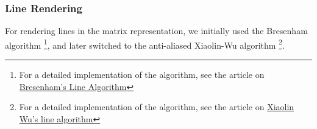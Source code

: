 \subsubsection{Line Rendering}

For rendering lines in the matrix representation, we initially used the Bresenham algorithm \footnote{For a detailed implementation of the algorithm, see the article on \href{https://en.wikipedia.org/wiki/Bresenham\%27s\_line\_algorithm\#Algorithm}{Bresenham's Line Algorithm}}, and later switched to the anti-aliased Xiaolin-Wu algorithm  \footnote{For a detailed implementation of the algorithm, see the article on \href{https://en.wikipedia.org/wiki/Xiaolin_Wu\%27s_line_algorithm}{Xiaolin Wu's line algorithm}}.

